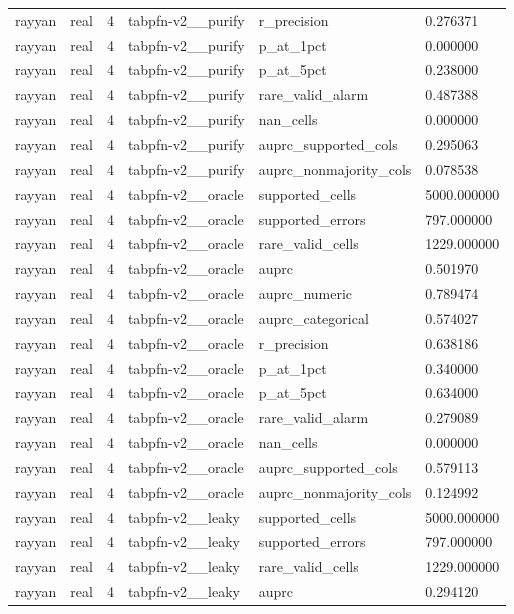 \begin{tabular}{llllll}
rayyan & real & 4 & tabpfn-v2\_\_purify & r\_precision & 0.276371 \\
rayyan & real & 4 & tabpfn-v2\_\_purify & p\_at\_1pct & 0.000000 \\
rayyan & real & 4 & tabpfn-v2\_\_purify & p\_at\_5pct & 0.238000 \\
rayyan & real & 4 & tabpfn-v2\_\_purify & rare\_valid\_alarm & 0.487388 \\
rayyan & real & 4 & tabpfn-v2\_\_purify & nan\_cells & 0.000000 \\
rayyan & real & 4 & tabpfn-v2\_\_purify & auprc\_supported\_cols & 0.295063 \\
rayyan & real & 4 & tabpfn-v2\_\_purify & auprc\_nonmajority\_cols & 0.078538 \\
rayyan & real & 4 & tabpfn-v2\_\_oracle & supported\_cells & 5000.000000 \\
rayyan & real & 4 & tabpfn-v2\_\_oracle & supported\_errors & 797.000000 \\
rayyan & real & 4 & tabpfn-v2\_\_oracle & rare\_valid\_cells & 1229.000000 \\
rayyan & real & 4 & tabpfn-v2\_\_oracle & auprc & 0.501970 \\
rayyan & real & 4 & tabpfn-v2\_\_oracle & auprc\_numeric & 0.789474 \\
rayyan & real & 4 & tabpfn-v2\_\_oracle & auprc\_categorical & 0.574027 \\
rayyan & real & 4 & tabpfn-v2\_\_oracle & r\_precision & 0.638186 \\
rayyan & real & 4 & tabpfn-v2\_\_oracle & p\_at\_1pct & 0.340000 \\
rayyan & real & 4 & tabpfn-v2\_\_oracle & p\_at\_5pct & 0.634000 \\
rayyan & real & 4 & tabpfn-v2\_\_oracle & rare\_valid\_alarm & 0.279089 \\
rayyan & real & 4 & tabpfn-v2\_\_oracle & nan\_cells & 0.000000 \\
rayyan & real & 4 & tabpfn-v2\_\_oracle & auprc\_supported\_cols & 0.579113 \\
rayyan & real & 4 & tabpfn-v2\_\_oracle & auprc\_nonmajority\_cols & 0.124992 \\
rayyan & real & 4 & tabpfn-v2\_\_leaky & supported\_cells & 5000.000000 \\
rayyan & real & 4 & tabpfn-v2\_\_leaky & supported\_errors & 797.000000 \\
rayyan & real & 4 & tabpfn-v2\_\_leaky & rare\_valid\_cells & 1229.000000 \\
rayyan & real & 4 & tabpfn-v2\_\_leaky & auprc & 0.294120 \\

\end{tabular}
